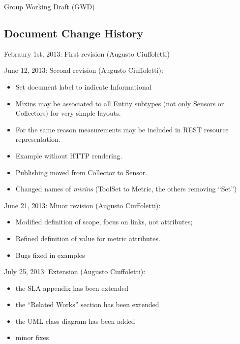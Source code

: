 \documentclass[10pt]{article}  %
\begin{document}
Group Working Draft (GWD)



\subsection*{Document Change History}

Febraury 1st, 2013: First revision (Augusto Ciuffoletti)

June 12, 2013: Second revision (Augusto Ciuffoletti):
\begin{itemize}
\item Set document label to indicate Informational
\item Mixins may be associated to all Entity subtypes (not only Sensors or Collectors) for very simple layouts. 
\item For the same reason measurements may be included in REST resource representation. 
\item Example without HTTP rendering. 
\item Publishing moved from Collector to Sensor.
\item Changed names of {\em mixins} (ToolSet to Metric, the others removing ``Set'')
\end{itemize}

June 21, 2013: Minor revision (Augusto Ciuffoletti):
\begin{itemize}
\item Modified definition of scope, focus on links, not attributes;
\item Refined definition of value for metric attributes.
\item Bugs fixed in examples
\end{itemize}

July 25, 2013: Extension (Augusto Ciuffoletti):
\begin{itemize}
\item the SLA appendix has been extended
\item the ``Related Works'' section has been extended
\item the UML class diagram has been added
\item minor fixes
\end{itemize}
\end{document}
